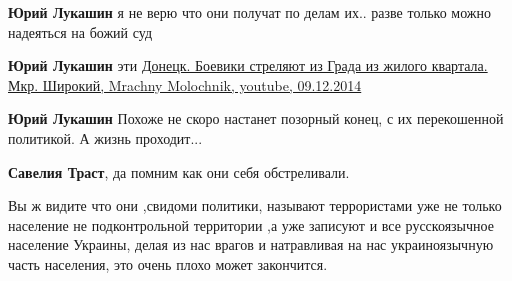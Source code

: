 \begin{itemize}
\begin{itemize}
 
\textbf{Юрий Лукашин} я не верю что они получат по делам их.. разве только можно надеяться на божий суд

 
\textbf{Юрий Лукашин} эти \href{https://youtu.be/N1zbZZii5rs}{%
Донецк. Боевики стреляют из Града из жилого квартала. Мкр. Широкий, %
Mrachny Molochnik, %
youtube, 09.12.2014%
}

 
\textbf{Юрий Лукашин}
Похоже не скоро настанет позорный конец, с их перекошенной политикой.
А жизнь проходит...

 
\textbf{Савелия Траст}, да помним как они себя обстреливали.

 

Вы ж видите что они ,свидоми политики, называют террористами уже не только
население не подконтрольной территории ,а уже записуют и все русскоязычное
население Украины, делая из нас врагов и натравливая на нас украиноязычную часть
населения, это очень плохо может закончится.

\end{itemize}

 

\end{itemize}
